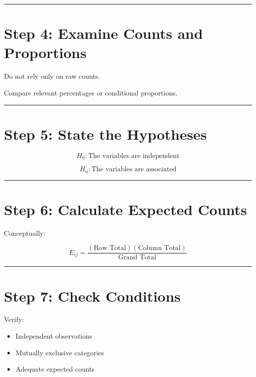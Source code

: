 \documentclass[
  letterpaper,
  DIV=11,
  numbers=noendperiod]{scrreprt}
\providecommand{\tightlist}{%
  \setlength{\itemsep}{0pt}\setlength{\parskip}{0pt}}
\begin{document}
\begin{center}\rule{0.5\linewidth}{0.5pt}\end{center}

\section{Step 4: Examine Counts and
Proportions}\label{step-4-examine-counts-and-proportions}

Do not rely only on raw counts.

Compare relevant percentages or conditional proportions.

\begin{center}\rule{0.5\linewidth}{0.5pt}\end{center}

\section{Step 5: State the
Hypotheses}\label{step-5-state-the-hypotheses}

\[
H_0:
\text{The variables are independent}
\]

\[
H_a:
\text{The variables are associated}
\]

\begin{center}\rule{0.5\linewidth}{0.5pt}\end{center}

\section{Step 6: Calculate Expected
Counts}\label{step-6-calculate-expected-counts}

Conceptually:

\[
E_{ij}
=
\frac{
(\text{Row Total})
(\text{Column Total})
}{
\text{Grand Total}
}
\]

\begin{center}\rule{0.5\linewidth}{0.5pt}\end{center}

\section{Step 7: Check Conditions}\label{step-7-check-conditions}

Verify:

\begin{itemize}
\tightlist
\item
  Independent observations
\item
  Mutually exclusive categories
\item
  Adequate expected counts
\end{itemize}
\end{document}
